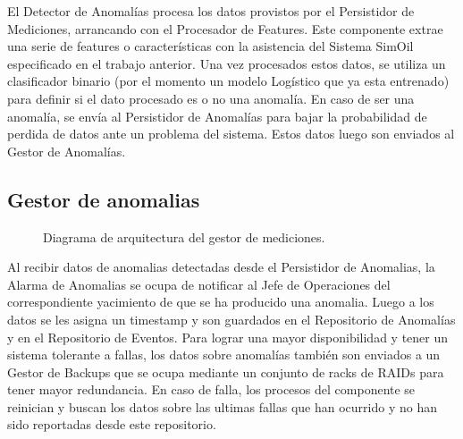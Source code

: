 \documentclass{article}
\theoremstyle{definition}
\theoremstyle{remark}
\begin{document}
El Detector de Anomalías procesa los datos provistos por el Persistidor de Mediciones, arrancando con el Procesador de Features. Este componente extrae una serie de features o características con la asistencia del Sistema SimOil especificado en el trabajo anterior. Una vez procesados estos datos, se utiliza un clasificador binario (por el momento un modelo Logístico que ya esta entrenado) para definir si el dato procesado es o no una anomalía. En caso de ser una anomalía, se envía al Persistidor de Anomalías para bajar la probabilidad de perdida de datos ante un problema del sistema. Estos datos luego son enviados al Gestor de Anomalías.

\subsection{Gestor de anomalias} \label{gestor_anomalias}

\begin{figure}[H]
  \caption{Diagrama de arquitectura del gestor de mediciones.}
\end{figure}

Al recibir datos de anomalias detectadas desde el Persistidor de Anomalias, la Alarma de Anomalias se ocupa de notificar al Jefe de Operaciones del correspondiente yacimiento de que se ha producido una anomalia. Luego a los datos se les asigna un timestamp y son guardados en el Repositorio de Anomalías y en el Repositorio de Eventos. Para lograr una mayor disponibilidad y tener un sistema tolerante a fallas, los datos sobre anomalías también son enviados a un Gestor de Backups que se ocupa mediante un conjunto de racks de RAIDs para tener mayor redundancia. En caso de falla, los procesos del componente se reinician y buscan los datos sobre las ultimas fallas que han ocurrido y no han sido reportadas desde este repositorio.
\end{document}
